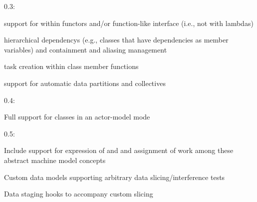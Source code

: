 \begin{compactdesc}
\item[0.3:]
\begin{compactitem}
\item support for  within functors and/or
function-like interface (i.e., not with lambdas)
\item hierarchical \glspl{dependency} (e.g., classes that have dependencies as
member variables) and containment and aliasing management
\item task creation within class member functions
\item support for automatic data partitions and collectives
\end{compactitem}
\item[0.4:]
\begin{compactitem}
\item Full support for classes in an actor-model mode 
\end{compactitem}
\item[0.5:]
\begin{compactitem}
\item Include support for expression of  and
 and assignment of work among these abstract machine
model concepts
\item Custom data models supporting arbitrary data slicing/interference tests
\item Data staging hooks to accompany custom slicing
\end{compactitem}
\end{compactdesc}
